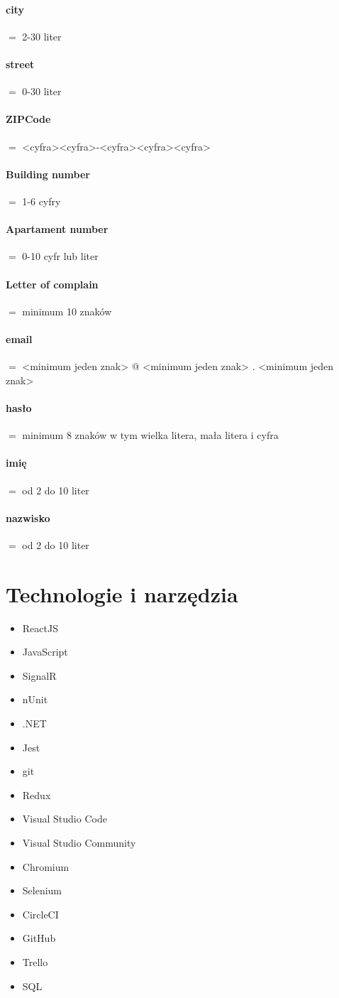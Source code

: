 \documentclass[10pt]{report}
\begin{document}
		\paragraph{city} $=$  2-30 liter
		\paragraph{street} $=$ 0-30 liter
		\paragraph{ZIPCode} $=$ <cyfra><cyfra>-<cyfra><cyfra><cyfra>
		\paragraph{Building number} $=$ 1-6 cyfry
		\paragraph{Apartament number} $=$ 0-10 cyfr lub liter
		\paragraph{Letter of complain} $=$  minimum 10 znaków
		\paragraph{email} $=$ <minimum jeden znak> @ <minimum jeden znak> .  <minimum jeden znak>
		\paragraph{hasło} $=$ minimum 8 znaków w tym wielka litera, mała litera i cyfra 
		\paragraph{imię}  $=$ od 2 do 10 liter
		\paragraph{nazwisko} $=$ od 2 do 10 liter

	
\section{Technologie i narzędzia}

\begin{itemize}
	\item ReactJS
	\item JavaScript
	\item SignalR 
	\item nUnit  
	\item .NET 
	\item Jest
	\item git
	\item Redux
	\item Visual Studio Code  
	\item Visual Studio Community 
	\item Chromium
	\item Selenium
	\item CircleCI
	\item GitHub 
	\item  Trello
	\item SQL
\end{itemize}

	
	
\end{document}
